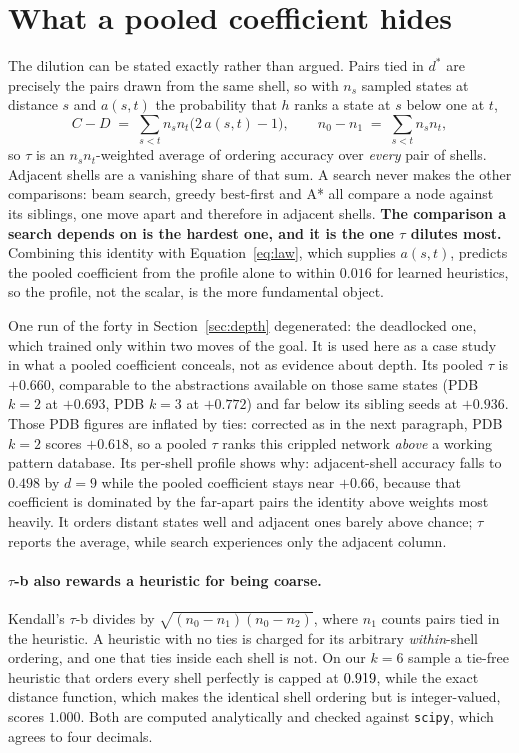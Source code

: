 \documentclass{article}
\begin{document}
\section{What a pooled coefficient hides}
\label{sec:pooled}

The dilution can be stated exactly rather than argued. Pairs tied in $d^*$ are
precisely the pairs drawn from the same shell, so with $n_s$ sampled states at
distance $s$ and $a(s,t)$ the probability that $h$ ranks a state at $s$ below one
at $t$,
\[
  C - D \;=\; \sum_{s<t} n_s n_t \bigl(2\,a(s,t) - 1\bigr),
  \qquad
  n_0 - n_1 \;=\; \sum_{s<t} n_s n_t ,
\]
so $\tau$ is an $n_s n_t$-weighted average of ordering accuracy over \emph{every}
pair of shells. Adjacent shells are a vanishing share of that sum. A search never
makes the other comparisons: beam search, greedy best-first and A* all compare a
node against its siblings, one move apart and therefore in adjacent shells.
\textbf{The comparison a search depends on is the hardest one, and it is the one
$\tau$ dilutes most.} Combining this identity with Equation~\ref{eq:law}, which
supplies $a(s,t)$, predicts the pooled coefficient from the profile alone to
within $0.016$ for learned heuristics, so the profile, not the scalar, is the
more fundamental object.

One run of the forty in Section~\ref{sec:depth} degenerated: the deadlocked
one, which trained only within two moves of the goal. It is used here as a case
study in what a pooled coefficient conceals, not as evidence about depth. Its
pooled $\tau$ is $+0.660$, comparable to the abstractions available on those same
states (PDB $k{=}2$ at $+0.693$, PDB $k{=}3$ at $+0.772$) and far below its
sibling seeds at $+0.936$. Those PDB figures are inflated by ties: corrected as in
the next paragraph, PDB $k{=}2$ scores $+0.618$, so a pooled $\tau$ ranks
this crippled network \emph{above} a working pattern database. Its per-shell profile shows why:
adjacent-shell accuracy falls to $0.498$ by $d=9$ while the pooled coefficient
stays near $+0.66$, because that coefficient is dominated by the far-apart pairs
the identity above weights most heavily. It orders distant states well and
adjacent ones barely above chance; $\tau$ reports the average, while search
experiences only the adjacent column.

\paragraph{$\tau$-b also rewards a heuristic for being coarse.} Kendall's
$\tau$-b divides by $\sqrt{(n_0-n_1)(n_0-n_2)}$, where $n_1$ counts pairs tied in
the heuristic. A heuristic with no ties is charged for its arbitrary
\emph{within}-shell ordering, and one that ties inside each shell is not. On our
$k=6$ sample a tie-free heuristic that orders every shell perfectly is capped at
$0.919$, while the exact distance function, which makes the identical shell
ordering but is integer-valued, scores $1.000$. Both are computed
analytically and checked against \texttt{scipy}, which agrees to four decimals.
\end{document}
